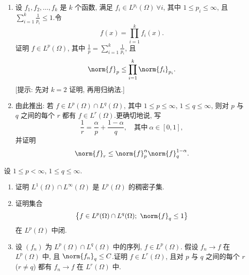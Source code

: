 \begin{exercise}
\label{exer:4.4}
\begin{enumerate}[label=\arabic*., leftmargin=2.2em, itemsep=0.35em]
	\item 设 $f_1,f_2,\dots,f_k$ 是 $k$ 个函数, 满足 $f_i\in L^{p_i}(\Omega)\ \forall i$,
	      其中 $1\le p_i\le\infty$, 且 $\sum_{i=1}^k\frac1{p_i}\le1$.令
	      \begin{equation*}
	      f(x)=\prod_{i=1}^kf_i(x).
	      \end{equation*}
	      证明 $f\in L^p(\Omega)$, 其中 $\frac1p=\sum_{i=1}^k\frac1{p_i}$, 且
	      \begin{equation*}
	      \norm{f}_p\le\prod_{i=1}^k\norm{f_i}_{p_i}.
	      \end{equation*}
	      [提示: 先对 $k=2$ 证明, 再用归纳法.]
	\item 由此推出: 若 $f\in L^p(\Omega)\cap L^q(\Omega)$, 其中
	      $1\le p\le\infty$, $1\le q\le\infty$, 则对 $p$ 与 $q$ 之间的每个 $r$
	      都有 $f\in L^r(\Omega)$.更确切地说, 写
	      \begin{equation*}
	      \frac1r=\frac\alpha p+\frac{1-\alpha}q,\quad\text{其中}\ \alpha\in[0,1],
	      \end{equation*}
	      并证明
	      \begin{equation*}
	      \norm{f}_r\le\norm{f}_p^\alpha\norm{f}_q^{1-\alpha}.
	      \end{equation*}
\end{enumerate}
\end{exercise}

\begin{exercise}
\label{exer:4.5}
设 $1\le p<\infty$, $1\le q\le\infty$.
\begin{enumerate}[label=\arabic*., leftmargin=2.2em, itemsep=0.35em]
	\item 证明 $L^1(\Omega)\cap L^\infty(\Omega)$ 是 $L^p(\Omega)$ 的稠密子集.
	\item 证明集合
	      \begin{equation*}
	      \bigl\{f\in L^p(\Omega)\cap L^q(\Omega);\ \norm{f}_q\le1\bigr\}
	      \end{equation*}
	      在 $L^p(\Omega)$ 中闭.
	\item 设 $(f_n)$ 为 $L^p(\Omega)\cap L^q(\Omega)$ 中的序列, $f\in L^p(\Omega)$.
	      假设 $f_n\to f$ 在 $L^p(\Omega)$ 中, 且 $\norm{f_n}_q\le C$.证明
	      $f\in L^r(\Omega)$, 且对 $p$ 与 $q$ 之间的每个 $r$ ($r\ne q$) 都有
	      $f_n\to f$ 在 $L^r(\Omega)$ 中.
\end{enumerate}
\end{exercise}

